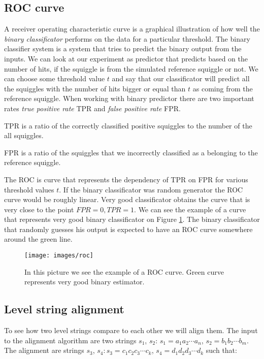 \subsection{ROC curve}

A receiver operating characteristic curve is a graphical illustration of how well
the \textit{binary classificator} performs on the data for a particular threshold. The binary
classifier system is a system that tries to predict the binary output from the inputs.
We can look at our experiment as predictor that predicts based on the number of hits, if the squiggle is from the
simulated reference squiggle or not. We can choose some threshold value $t$ and say that
our classificator will predict all the squiggles with the number of hits bigger or equal
than $t$ as coming from the reference squiggle. When working with binary predictor there
are two important rates \textit{true positive rate} TPR and \textit{false positive rate} FPR. 

TPR is a ratio of the correctly classified positive squiggles to the number of the all squiggles.

FPR is a ratio of the squiggles that we incorrectly classified as a belonging to the reference squiggle.

The ROC is curve that represents the dependency of TPR on FPR for various threshold values $t$.
If the binary classificator was random generator the ROC curve would be roughly
linear. Very good classificator obtains the curve that is very close to the point
$FPR = 0, TPR = 1$. We can see the example of a curve that represents very good
binary classificator on Figure \ref{obr:roc}. The binary classificator that randomly
guesses his output is expected to have an ROC curve somewhere around the green line.

\begin{figure}
\centerline{\texttt{[image: images/roc]}}
\caption[TODO]{In this picture we see the example of a ROC curve. Green curve represents very good
binary estimator.}
\label{obr:roc}
\end{figure}

\subsection{Level string alignment}
\label{section:alignment}

To see how two level strings compare to each other we will align them. The input
to the alignment algorithm are two strings $s_1$, $s_2$:
$s_1=a_1a_2\cdots a_n$, $s_2=b_1b_2\cdots b_m$. The alignment are strings
$s_3$, $s_4: s_3 = c_1c_2c_3\cdots c_k$, $s_4 = d_1d_2d_3\cdots d_k$ such that:

